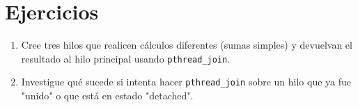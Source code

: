 \documentclass[12pt,a4paper]{article}
\begin{document}
\section{Ejercicios}
\begin{enumerate}
    \item Cree tres hilos que realicen cálculos diferentes (sumas simples) y devuelvan el resultado al hilo principal usando \texttt{pthread\_join}.
    \item Investigue qué sucede si intenta hacer \texttt{pthread\_join} sobre un hilo que ya fue "unido" o que está en estado "detached".
\end{enumerate}
\end{document}
